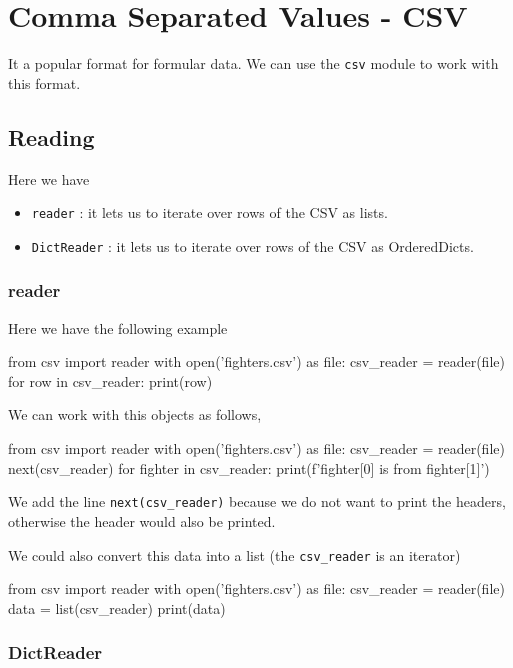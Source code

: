 \section{Comma Separated Values - CSV}

It a popular format for formular data. We can use the \verb|csv| module to work with this format. 

\subsection{Reading}

Here we have 
\begin{itemize}
    \item \verb|reader| : it lets us to iterate over rows of the CSV as lists.
    \item \verb|DictReader| : it lets us to iterate over rows of the CSV as OrderedDicts.
\end{itemize}

\subsubsection{reader}

Here we have the following example
\begin{listing}{1}
from csv import reader
with open('fighters.csv') as file:
    csv_reader = reader(file)
    for row in csv_reader:
        print(row)    
\end{listing}

We can work with this objects as follows, 
\begin{listing}{1}
from csv import reader
with open('fighters.csv') as file:
    csv_reader = reader(file)
    next(csv_reader)
    for fighter in csv_reader:
        print(f'{fighter[0]} is from {fighter[1]}')    
\end{listing}
We add the line \verb|next(csv_reader)| because we do not want to print the headers, otherwise the header would also be printed. 

We could also convert this data into a list (the \verb|csv_reader| is an iterator)
\begin{listing}{1}
from csv import reader
with open('fighters.csv') as file:
    csv_reader = reader(file)
    data = list(csv_reader)
    print(data)    
\end{listing}

\subsubsection{DictReader}

